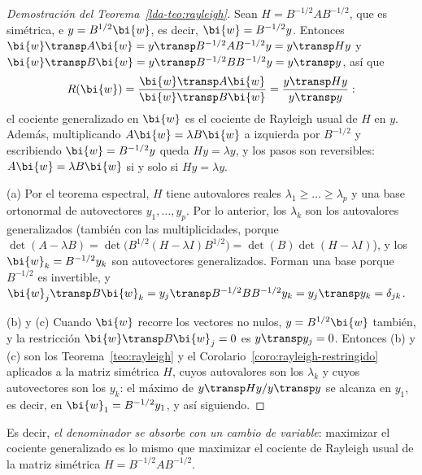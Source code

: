 \begin{proof}[Demostración del Teorema~\ref{lda-teo:rayleigh}]
Sean $H=B^{-1/2}AB^{-1/2}$, que es simétrica, e $y=B^{1/2}\bi{w}$, es decir,
$\bi{w}=B^{-1/2}y$. Entonces $\bi{w}\transp A\bi{w}=y\transp B^{-1/2}AB^{-1/2}y=y\transp Hy$ y
$\bi{w}\transp B\bi{w}=y\transp B^{-1/2}BB^{-1/2}y=y\transp y$, así que
\[
R(\bi{w})=\frac{\bi{w}\transp A\bi{w}}{\bi{w}\transp B\bi{w}}=\frac{y\transp Hy}{y\transp y}:
\]
el cociente generalizado en $\bi{w}$ es el cociente de Rayleigh usual de $H$ en
$y$. Además, multiplicando $A\bi{w}=\lambda B\bi{w}$ a izquierda por $B^{-1/2}$ y
escribiendo $\bi{w}=B^{-1/2}y$ queda $Hy=\lambda y$, y los pasos son reversibles:
$A\bi{w}=\lambda B\bi{w}$ si y solo si $Hy=\lambda y$.

(a) Por el teorema espectral, $H$ tiene autovalores reales
$\lambda_1\ge\dots\ge\lambda_p$ y una base ortonormal de autovectores
$y_1,\dots,y_p$. Por lo anterior, los $\lambda_k$ son los autovalores
generalizados (también con las multiplicidades, porque
$\det(A-\lambda B)=\det\bigl(B^{1/2}(H-\lambda I)B^{1/2}\bigr)=\det(B)\det(H-\lambda I)$),
y los $\bi{w}_k=B^{-1/2}y_k$ son autovectores generalizados. Forman una base porque
$B^{-1/2}$ es invertible, y
$\bi{w}_j\transp B\bi{w}_k=y_j\transp B^{-1/2}BB^{-1/2}y_k=y_j\transp y_k=\delta_{jk}$.

(b) y (c) Cuando $\bi{w}$ recorre los vectores no nulos, $y=B^{1/2}\bi{w}$ también, y la
restricción $\bi{w}\transp B\bi{w}_j=0$ es $y\transp y_j=0$. Entonces (b) y (c) son los
Teorema~\ref{teo:rayleigh} y el Corolario~\ref{coro:rayleigh-restringido}
aplicados a la matriz simétrica $H$, cuyos autovalores son los $\lambda_k$ y
cuyos autovectores son los $y_k$: el máximo de $y\transp Hy/y\transp y$ se
alcanza en $y_1$, es decir, en $\bi{w}_1=B^{-1/2}y_1$, y así siguiendo.
\end{proof}

Es decir, \emph{el denominador se absorbe con un cambio de variable}:
maximizar el cociente generalizado es lo mismo que maximizar el cociente de
Rayleigh usual de la matriz simétrica $H=B^{-1/2}AB^{-1/2}$.

